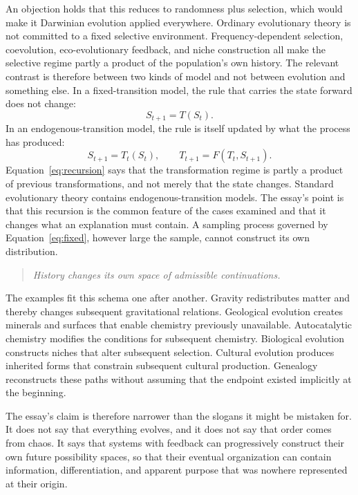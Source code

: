 \documentclass[11pt]{article}
\newenvironment{principle}{\begin{quote}\itshape}{\end{quote}}
\begin{document}
An objection holds that this reduces to randomness plus selection, which would make it Darwinian evolution applied everywhere. Ordinary evolutionary theory is not committed to a fixed selective environment. Frequency-dependent selection, coevolution, eco-evolutionary feedback, and niche construction all make the selective regime partly a product of the population's own history. The relevant contrast is therefore between two kinds of model and not between evolution and something else. In a fixed-transition model, the rule that carries the state forward does not change:
\begin{equation}\label{eq:fixed}
S_{t+1} = T(S_t).
\end{equation}
In an endogenous-transition model, the rule is itself updated by what the process has produced:
\begin{equation}\label{eq:recursion}
S_{t+1} = T_t(S_t), \qquad T_{t+1} = F(T_t, S_{t+1}).
\end{equation}
Equation~\eqref{eq:recursion} says that the transformation regime is partly a product of previous transformations, and not merely that the state changes. Standard evolutionary theory contains endogenous-transition models. The essay's point is that this recursion is the common feature of the cases examined and that it changes what an explanation must contain. A sampling process governed by Equation~\eqref{eq:fixed}, however large the sample, cannot construct its own distribution.
\begin{principle}
History changes its own space of admissible continuations.
\end{principle}

The examples fit this schema one after another. Gravity redistributes matter and thereby changes subsequent gravitational relations. Geological evolution creates minerals and surfaces that enable chemistry previously unavailable. Autocatalytic chemistry modifies the conditions for subsequent chemistry. Biological evolution constructs niches that alter subsequent selection. Cultural evolution produces inherited forms that constrain subsequent cultural production. Genealogy reconstructs these paths without assuming that the endpoint existed implicitly at the beginning.

The essay's claim is therefore narrower than the slogans it might be mistaken for. It does not say that everything evolves, and it does not say that order comes from chaos. It says that systems with feedback can progressively construct their own future possibility spaces, so that their eventual organization can contain information, differentiation, and apparent purpose that was nowhere represented at their origin.
\end{document}
